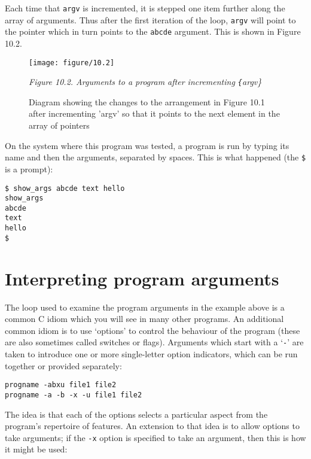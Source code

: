   
  Each time that \texttt{argv} is incremented, it is stepped one item
   further along the array of arguments. Thus after the first iteration of
   the loop, \texttt{argv} will point to the pointer which in turn
   points to the \texttt{abcde} argument.  This is shown in
   Figure 10.2.


   \begin{figure*}\centering
     \texttt{[image: figure/10.2]}
     \caption{Diagram showing the changes to the arrangement in Figure 10.1
       after incrementing 'argv' so that it points to the next
       element in the array of pointers}

   \begin{center}
     \textit{Figure 10.2. Arguments to a program after incrementing
       \texttt\{argv\}}
   \end{center}
   \end{figure*}


  On the system where this program was tested, a program is run by typing
   its name and then the arguments, separated by spaces. This is what
   happened (the \texttt{\$} is a prompt):


  \begin{Verbatim}
$ show_args abcde text hello
show_args
abcde
text
hello
$
\end{Verbatim}

 
        \section{Interpreting program arguments}
        

  

  The loop used to examine the program arguments in the example above is
   a common C idiom which you will see in many other programs. An additional
   common idiom is to use `options' to control the behaviour of the
   program (these are also sometimes called switches or flags). Arguments which
   start with a `\texttt{-}' are taken to introduce one or more
   single-letter option indicators, which can be run together or provided
   separately:


  \begin{Verbatim}
progname -abxu file1 file2
progname -a -b -x -u file1 file2
\end{Verbatim}

  The idea is that each of the options selects a particular aspect from the
   program's repertoire of features. An extension to that idea is to allow
   options to take arguments; if the \texttt{-x} option is specified to
   take an argument, then this is how it might be used:


